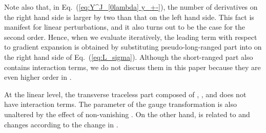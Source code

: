 \documentclass[a4paper,showpacs,preprintnumbers,amsmath,amssymb]{revtex4}
\begin{document}
Note also that, in Eq.~(\ref{eq:Y^J_[0lambda] y_+-}), the number of \coordHE{} derivatives on the right hand side is larger by two than that on the left hand side. 
This fact is manifest for linear perturbations, and it also turns out to be the case for the second order. Hence, when we evaluate \coordHE{} iteratively, the leading term with respect to gradient expansion is obtained by substituting pseudo-long-ranged part 
\coordHE{} into  \coordHE{} on the right hand side of Eq.~(\ref{eq:L_sigma}).  Although the short-ranged part \coordHE{} also contains interaction terms, we do not discuss them in this paper because they are even higher order in \coordHE{}. 


At the linear level, the transverse traceless part composed of 
\coordHE{}, \coordHE{}, and \coordHE{} does not have interaction terms. 
The parameter of the gauge transformation \coordHE{} is also unaltered by the effect of non-vanishing \myHighlight{$\lambda_\pm$}\coordHE{}.  
On the other hand, \coordHE{} is related to \coordHE{} and changes according to the change in \coordHE{}. 
\end{document}
